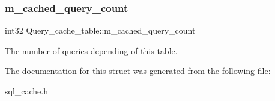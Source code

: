 \subsubsection{\texorpdfstring{m\+\_\+cached\+\_\+query\+\_\+count}{m\_cached\_query\_count}}
{\footnotesize\ttfamily int32 Query\+\_\+cache\+\_\+table\+::m\+\_\+cached\+\_\+query\+\_\+count}

The number of queries depending of this table. 

The documentation for this struct was generated from the following file\+:\begin{DoxyCompactItemize}
\item 
sql\+\_\+cache.\+h\end{DoxyCompactItemize}
